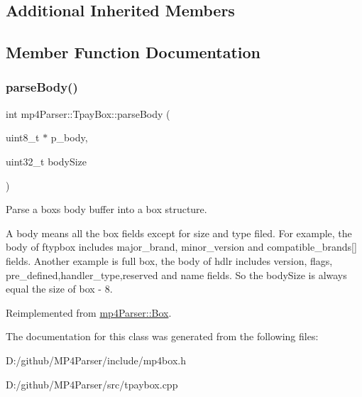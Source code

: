 \subsection*{Additional Inherited Members}


\subsection{Member Function Documentation}
\mbox{\label{classmp4_parser_1_1_tpay_box_a3a1d0623a4d4a5fec2fa1843c4e2d329}} 
\subsubsection{\texorpdfstring{parseBody()}{parseBody()}}
{\footnotesize\ttfamily int mp4\+Parser\+::\+Tpay\+Box\+::parse\+Body (\begin{DoxyParamCaption}\item[{uint8\+\_\+t $\ast$}]{p\+\_\+body,  }\item[{uint32\+\_\+t}]{body\+Size }\end{DoxyParamCaption})\hspace{0.3cm}{\ttfamily [virtual]}}



Parse a box\textquotesingle{}s body buffer into a box structure. 

A body means all the box fields except for size and type filed. For example, the body of ftypbox includes major\+\_\+brand, minor\+\_\+version and compatible\+\_\+brands\mbox{[}\mbox{]} fields. Another example is full box, the body of hdlr includes version, flags, pre\+\_\+defined,handler\+\_\+type,reserved and name fields. So the body\+Size is always equal the size of box -\/ 8. 

Reimplemented from \mbox{\hyperlink{classmp4_parser_1_1_box_a3dd0c084ac65bc77b69ac5ecaf796cb2}{mp4\+Parser\+::\+Box}}.



The documentation for this class was generated from the following files\+:\begin{DoxyCompactItemize}
\item 
D\+:/github/\+M\+P4\+Parser/include/mp4box.\+h\item 
D\+:/github/\+M\+P4\+Parser/src/tpaybox.\+cpp\end{DoxyCompactItemize}
